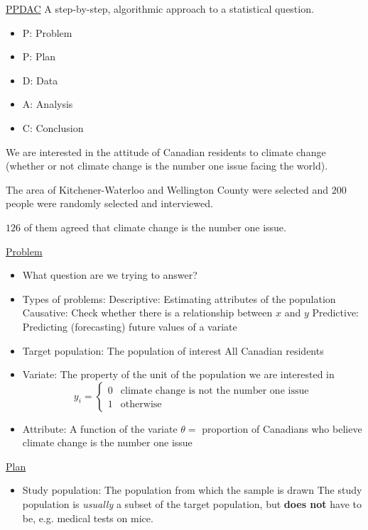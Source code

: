 \underline{PPDAC}
A step-by-step, algorithmic approach to a statistical question.
\begin{itemize}
    \item P: Problem
    \item P: Plan
    \item D: Data
    \item A: Analysis
    \item C: Conclusion
\end{itemize}
\begin{exbox}
    \begin{example}
        We are interested in the attitude of Canadian residents to climate change
        (whether or not climate change is the number one issue facing the world).

        The area of Kitchener-Waterloo and Wellington County were selected
        and $ 200 $ people were randomly selected and interviewed.

        $ 126 $ of them agreed that climate change is the number one issue.
    \end{example}
\end{exbox}
\underline{Problem}
\begin{itemize}
    \item What question are we trying to answer?
    \item Types of problems:
          \subitem Descriptive: Estimating attributes of the population
          \subitem Causative: Check whether there is a relationship between $ x $ and $ y $
          \subitem Predictive: Predicting (forecasting) future values of a variate
    \item Target population: The population of interest
          \subitem All Canadian residents
    \item Variate: The property of the unit of the population we are interested in
          \subitem \[ y_i=
              \begin{cases}
                  0 & \text{climate change is not the number one issue} \\
                  1 & \text{otherwise}
              \end{cases} \]
    \item Attribute: A function of the variate
          \subitem $ \theta= $ proportion of Canadians who believe climate change is the number one issue
\end{itemize}
\underline{Plan}
\begin{itemize}
    \item Study population: The population from which the sample is drawn
          \subitem The study population is \emph{usually} a subset of the target population, but
          \textbf{does not} have to be, e.g. medical tests on mice.
\end{itemize}
